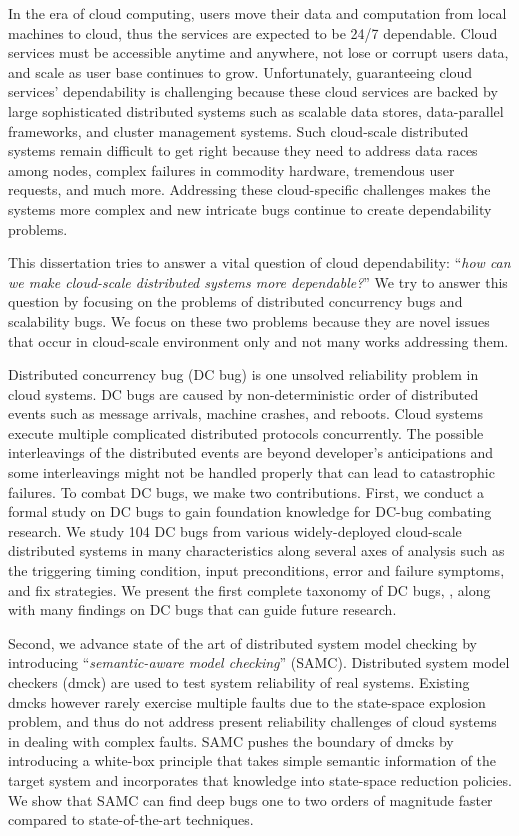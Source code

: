 In the era of cloud computing, users move their data
and computation from local machines to cloud,
thus the services are expected to be 24/7 dependable. Cloud services must be
accessible anytime and anywhere, not lose or corrupt users data, and scale as
user base continues to grow.  Unfortunately, guaranteeing cloud services'
dependability is challenging because these cloud services are backed by large
sophisticated distributed systems such as scalable data stores, data-parallel
frameworks, and cluster management systems. Such cloud-scale distributed systems
remain difficult to get right because they need to address data races among
nodes, complex failures in commodity hardware, tremendous user requests, and
much more. Addressing these cloud-specific challenges makes the systems
more complex and new intricate bugs continue to create dependability problems.

This dissertation tries to answer a vital question of cloud dependability:
``{\em how can we make cloud-scale distributed systems more dependable?}'' We
try to answer this question by focusing on the problems of distributed
concurrency bugs and scalability bugs. We focus on these two problems because
they are novel issues that occur in cloud-scale environment only and not many
works addressing them.

Distributed concurrency bug (DC bug) is one unsolved reliability problem in
cloud systems. DC bugs are caused by non-deterministic order of distributed
events such as message arrivals, machine crashes, and reboots. Cloud systems
execute multiple complicated distributed protocols concurrently. The possible
interleavings of the distributed events are beyond developer's anticipations and
some interleavings might not be handled properly that can lead to catastrophic
failures.
%
To combat DC bugs, we make two contributions. First, we conduct a formal study
on DC bugs to gain foundation knowledge for DC-bug combating research. We study
104 DC bugs from various widely-deployed cloud-scale distributed systems in
many characteristics along several axes of analysis such as the triggering
timing condition, input preconditions, error and failure symptoms, and fix
strategies. We present the first complete taxonomy of DC bugs, \taxdc, along
with many findings on DC bugs that can guide future research.

Second, we advance state of the art of distributed system model checking by
introducing ``{\em semantic-aware model checking}'' (SAMC). Distributed system
model checkers (dmck) are used to test system reliability of real systems.
Existing dmcks however rarely exercise multiple faults due to the state-space
explosion problem, and thus do not address present reliability challenges of
cloud systems in dealing with complex faults. SAMC pushes the boundary of dmcks
by introducing a white-box principle that takes simple semantic information of
the target system and incorporates that knowledge into state-space reduction
policies.  We show that SAMC can find deep bugs one to two orders of magnitude
faster compared to state-of-the-art techniques. 

